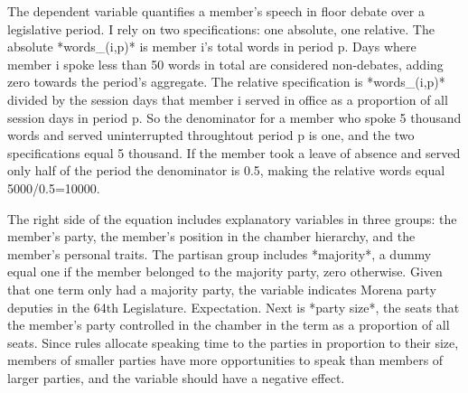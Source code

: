 \documentclass[letter,12pt]{article}
\begin{document}








The dependent variable quantifies a member's speech in floor debate over a legislative period. I rely on two specifications: one absolute, one relative. The absolute *words_(i,p)* is member i's total words in period p. Days where member i spoke less than 50 words in total are considered non-debates, adding zero towards the period's aggregate. The relative specification is *words_(i,p)* divided by the session days that member i served in office as a proportion of all session days in period p. So the denominator for a member who spoke 5 thousand words and served uninterrupted throughtout period p is one, and the two specifications equal 5 thousand. If the member took a leave of absence and served only half of the period the denominator is 0.5, making the relative words equal 5000/0.5=10000.  

The right side of the equation includes explanatory variables in three groups: the member's party, the member's position in the chamber hierarchy, and the member's personal traits. The partisan group includes *majority*, a dummy equal one if the member belonged to the majority party, zero otherwise. Given that one term only had a majority party, the variable indicates Morena party deputies in the 64th Legislature. Expectation. Next is *party size*, the seats that the member's party controlled in the chamber in the term as a proportion of all seats. Since rules allocate speaking time to the parties in proportion to their size, members of smaller parties have more opportunities to speak than  members of larger parties, and the variable should have a negative effect.
\end{document}
